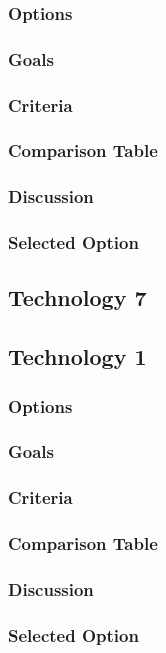 \documentclass[10pt,draftclsnofoot,onecolumn]{IEEEtran}
\begin{document}
\subsubsection{Options}
\subsubsection{Goals}
\subsubsection{Criteria}
\subsubsection{Comparison Table}
\subsubsection{Discussion}
\subsubsection{Selected Option}
\subsection{Technology 7}
\subsection{Technology 1}
\subsubsection{Options}
\subsubsection{Goals}
\subsubsection{Criteria}
\subsubsection{Comparison Table}
\subsubsection{Discussion}
\subsubsection{Selected Option}
\end{document}
